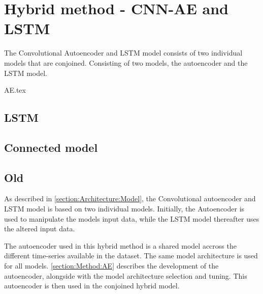 
\section{Hybrid method - CNN-AE and LSTM}


The Convolutional Autoencoder and LSTM model consists of two individual models that are conjoined.
Consisting of two models,
the autoencoder and the LSTM model.


{AE.tex}


\subsection{LSTM}



\subsection{Connected model}






\subsection{Old}


As described in \cref{section:Architecture:Model}, the Convolutional autoencoder and LSTM model
is based on two individual models.
Initially, the Autoencoder is used to manipulate the models input data,
while the LSTM model thereafter uses the altered input data.

The autoencoder used in this hybrid method is a shared model accross the different time-series
available in the dataset. The same model architecture is used for all models.
\cref{section:Method:AE} describes the development of the autoencoder, alongside with the model architecture selection and tuning.
This autoencoder is then used in the conjoined hybrid model.

